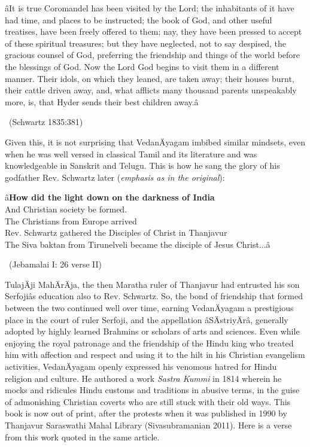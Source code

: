 \begin{myquote}
âIt is true Coromandel has been visited by the Lord; the inhabitants of it have had time, and places to be instructed; the book of God, and other useful treatises, have been freely offered to them; nay, they have been pressed to accept of these spiritual treasures; but they have neglected, not to say despised, the gracious counsel of God, preferring the friendship and things of the world before the blessings of God. Now the Lord God begins to visit them in a different manner. Their idols, on which they leaned, are taken away; their houses burnt, their cattle driven away, and, what afflicts many thousand parents unspeakably more, is, that Hyder sends their best children away.â 

~\hfill (Schwartz 1835:381)
\end{myquote}

\newpage

Given this, it is not surprising that VedanÄyagam imbibed similar mindsets, even when he was well versed in classical Tamil and its literature and was knowledgeable in Sanskrit and Telugu. This is how he sang the glory of his godfather Rev. Schwartz later (\textit{emphasis as in the original}):

\begin{myquote}
â\textbf{How did the light down on the darkness of India}\\ And Christian society be formed.\\ The Christians from Europe arrived\\ Rev. Schwartz gathered the Disciples of Christ in Thanjavur\\ The Siva baktan from Tirunelveli became the disciple of Jesus Christ...â 

~\hfill (Jebamalai I: 26 verse II)
\end{myquote}

TulajÄji MahÄrÄja, the then Maratha ruler of Thanjavur had entrusted his son Serfojiâs education also to Rev. Schwartz. So, the bond of friendship that formed between the two continued well over time, earning VedanÄyagam a prestigious place in the court of ruler Serfoji, and the appellation âSÄstriyÄrâ, generally adopted by highly learned Brahmins or scholars of arts and sciences. Even while enjoying the royal patronage and the friendship of the Hindu king who treated him with affection and respect and using it to the hilt in his Christian evangelism activities, VedanÄyagam openly expressed his venomous hatred for Hindu religion and culture. He authored a work \textit{Sastra Kummi} in 1814 wherein he mocks and ridicules Hindu customs and traditions in abusive terms, in the guise of admonishing Christian coverts who are still stuck with their old ways. This book is now out of print, after the protests when it was published in 1990 by Thanjavur Saraswathi Mahal Library (Sivasubramanian 2011). Here is a verse from this work quoted in the same article.

